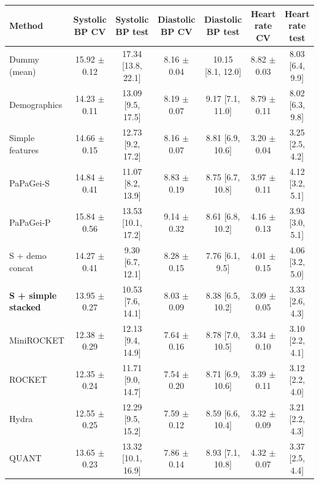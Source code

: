 \begin{tabular}{lcccccc}
\toprule
Method & Systolic BP CV & Systolic BP test & Diastolic BP CV & Diastolic BP test & Heart rate CV & Heart rate test \\
\midrule
Dummy (mean) & 15.92 $\pm$ 0.12 & 17.34 [13.8, 22.1] & 8.16 $\pm$ 0.04 & 10.15 [8.1, 12.0] & 8.82 $\pm$ 0.03 & 8.03 [6.4, 9.9] \\
Demographics & 14.23 $\pm$ 0.11 & 13.09 [9.5, 17.5] & 8.19 $\pm$ 0.07 & 9.17 [7.1, 11.0] & 8.79 $\pm$ 0.11 & 8.02 [6.3, 9.8] \\
Simple features & 14.66 $\pm$ 0.15 & 12.73 [9.2, 17.2] & 8.16 $\pm$ 0.07 & 8.81 [6.9, 10.6] & 3.20 $\pm$ 0.04 & 3.25 [2.5, 4.2] \\
PaPaGei-S & 14.84 $\pm$ 0.41 & 11.07 [8.2, 13.9] & 8.83 $\pm$ 0.19 & 8.75 [6.7, 10.8] & 3.97 $\pm$ 0.11 & 4.12 [3.2, 5.1] \\
PaPaGei-P & 15.84 $\pm$ 0.56 & 13.53 [10.1, 17.2] & 9.14 $\pm$ 0.32 & 8.61 [6.8, 10.2] & 4.16 $\pm$ 0.13 & 3.93 [3.0, 5.1] \\
S + demo concat & 14.27 $\pm$ 0.41 & 9.30 [6.7, 12.1] & 8.28 $\pm$ 0.15 & 7.76 [6.1, 9.5] & 4.01 $\pm$ 0.15 & 4.06 [3.2, 5.0] \\
\textbf{S + simple stacked} & 13.95 $\pm$ 0.27 & 10.53 [7.6, 14.1] & 8.03 $\pm$ 0.09 & 8.38 [6.5, 10.2] & 3.09 $\pm$ 0.05 & 3.33 [2.6, 4.3] \\
MiniROCKET & 12.38 $\pm$ 0.29 & 12.13 [9.4, 14.9] & 7.64 $\pm$ 0.16 & 8.78 [7.0, 10.5] & 3.34 $\pm$ 0.10 & 3.10 [2.2, 4.1] \\
ROCKET & 12.35 $\pm$ 0.24 & 11.71 [9.0, 14.7] & 7.54 $\pm$ 0.20 & 8.71 [6.9, 10.6] & 3.39 $\pm$ 0.11 & 3.12 [2.2, 4.0] \\
Hydra & 12.55 $\pm$ 0.25 & 12.29 [9.5, 15.2] & 7.59 $\pm$ 0.12 & 8.59 [6.6, 10.4] & 3.32 $\pm$ 0.09 & 3.21 [2.2, 4.3] \\
QUANT & 13.65 $\pm$ 0.23 & 13.32 [10.1, 16.9] & 7.86 $\pm$ 0.14 & 8.93 [7.1, 10.8] & 4.32 $\pm$ 0.07 & 3.37 [2.5, 4.4] \\
\bottomrule
\end{tabular}
